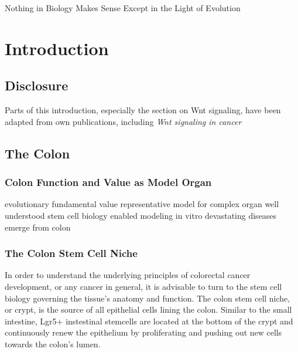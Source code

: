 \begin{savequote}[75mm]
Nothing in Biology Makes Sense Except in the Light of Evolution
\end{savequote}

\chapter{Introduction}
\label{introduction}
\begin{flushleft}
\setlength{\parindent}{7ex}
\section{Disclosure}
Parts of this introduction, especially the section on Wnt signaling, have been adapted from own publications, including \textit{Wnt signaling in cancer} \cite{Zhan2017}

\section{The Colon}
\subsection{Colon Function and Value as Model Organ}


evolutionary fundamental value
representative model for complex organ
well understood stem cell biology enabled modeling in vitro 
devastating diseases emerge from colon

\subsection{The Colon Stem Cell Niche}
In order to understand the underlying principles of colorectal cancer development, or any cancer in general, it is advisable to turn to the stem cell biology governing the tissue's anatomy and function. The colon stem cell niche, or crypt, is the source of all epithelial cells lining the colon. Similar to the small intestine, Lgr5+ instestinal stemcells are located at the bottom of the crypt and continuously renew the epithelium by proliferating and pushing out new cells towards the colon's lumen.


\end{flushleft}
